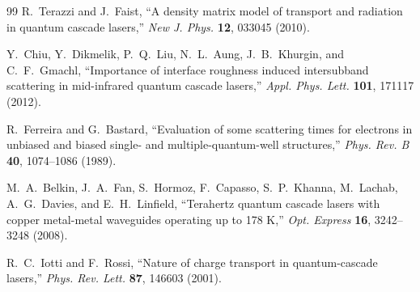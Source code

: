 \documentclass[11pt,letterpaper]{article}
\begin{document}
\begin{thebibliography}{99}
R.~Terazzi and J.~Faist, ``A density matrix model of transport and radiation in quantum cascade lasers,'' \textit{New J. Phys.} \textbf{12}, 033045 (2010).

Y.~Chiu, Y.~Dikmelik, P.~Q.~Liu, N.~L.~Aung, J.~B.~Khurgin, and C.~F.~Gmachl, ``Importance of interface roughness induced intersubband scattering in mid-infrared quantum cascade lasers,'' \textit{Appl. Phys. Lett.} \textbf{101}, 171117 (2012).

R.~Ferreira and G.~Bastard, ``Evaluation of some scattering times for electrons in unbiased and biased single- and multiple-quantum-well structures,'' \textit{Phys. Rev. B} \textbf{40}, 1074--1086 (1989).

M.~A.~Belkin, J.~A.~Fan, S.~Hormoz, F.~Capasso, S.~P.~Khanna, M.~Lachab, A.~G.~Davies, and E.~H.~Linfield, ``Terahertz quantum cascade lasers with copper metal-metal waveguides operating up to 178 K,'' \textit{Opt. Express} \textbf{16}, 3242--3248 (2008).

R.~C.~Iotti and F.~Rossi, ``Nature of charge transport in quantum-cascade lasers,'' \textit{Phys. Rev. Lett.} \textbf{87}, 146603 (2001).

\end{thebibliography}
\end{document}
